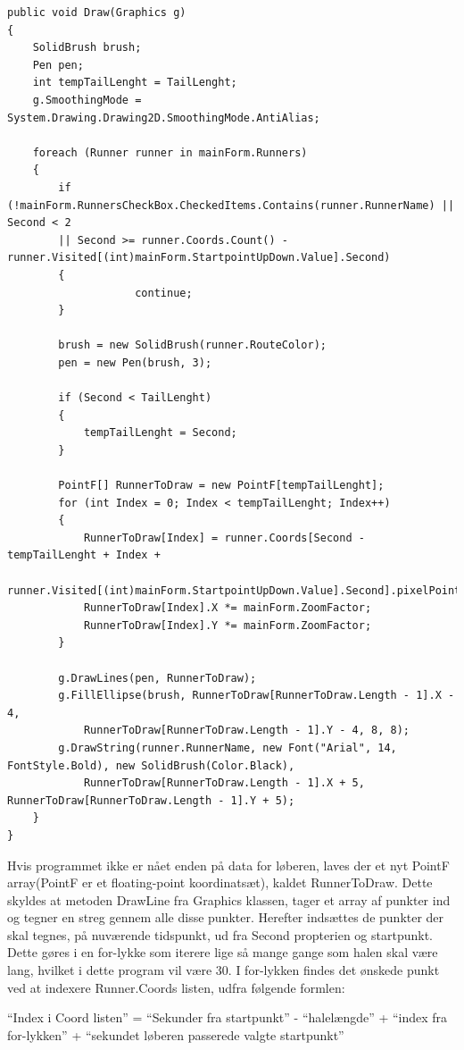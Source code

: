 \begin{lstlisting}
public void Draw(Graphics g)
{
    SolidBrush brush;
    Pen pen;
    int tempTailLenght = TailLenght;
    g.SmoothingMode = System.Drawing.Drawing2D.SmoothingMode.AntiAlias;

    foreach (Runner runner in mainForm.Runners)
    {
        if (!mainForm.RunnersCheckBox.CheckedItems.Contains(runner.RunnerName) || Second < 2
        || Second >= runner.Coords.Count() - runner.Visited[(int)mainForm.StartpointUpDown.Value].Second)
        {
                    continue;
        }

        brush = new SolidBrush(runner.RouteColor);
        pen = new Pen(brush, 3);

        if (Second < TailLenght)
        {
            tempTailLenght = Second;
        }

        PointF[] RunnerToDraw = new PointF[tempTailLenght];
        for (int Index = 0; Index < tempTailLenght; Index++)
        {
            RunnerToDraw[Index] = runner.Coords[Second - tempTailLenght + Index +
                runner.Visited[(int)mainForm.StartpointUpDown.Value].Second].pixelPoint;
            RunnerToDraw[Index].X *= mainForm.ZoomFactor;
            RunnerToDraw[Index].Y *= mainForm.ZoomFactor;
        }

        g.DrawLines(pen, RunnerToDraw);
        g.FillEllipse(brush, RunnerToDraw[RunnerToDraw.Length - 1].X - 4,
            RunnerToDraw[RunnerToDraw.Length - 1].Y - 4, 8, 8);
        g.DrawString(runner.RunnerName, new Font("Arial", 14, FontStyle.Bold), new SolidBrush(Color.Black),
            RunnerToDraw[RunnerToDraw.Length - 1].X + 5, RunnerToDraw[RunnerToDraw.Length - 1].Y + 5);
    }
}
\end{lstlisting}

Hvis programmet ikke er nået enden på data for løberen, laves der et nyt PointF array(PointF er et floating-point koordinatsæt), kaldet RunnerToDraw. Dette skyldes at metoden DrawLine fra Graphics klassen, tager et array af punkter ind og tegner en streg gennem alle disse punkter. Herefter indsættes de punkter der skal tegnes, på nuværende tidspunkt, ud fra Second propterien og startpunkt. Dette gøres i en for-lykke som iterere lige så mange gange som halen skal være lang, hvilket i dette program vil være 30. I for-lykken findes det ønskede punkt ved at indexere Runner.Coords listen, udfra følgende formlen:
 
“Index i Coord listen” = “Sekunder fra startpunkt” - “halelængde” + “index fra for-lykken”  + “sekundet løberen passerede valgte startpunkt”

